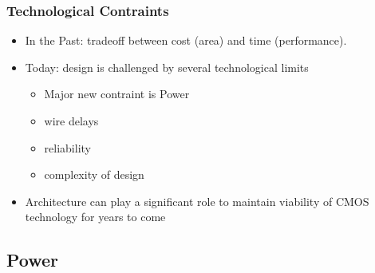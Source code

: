 \documentclass{beamer}
\begin{document}
\begin{frame}[fragile,t]
\frametitle{Technological Contraints}

\begin{itemize}
    \item In the Past: tradeoff between cost (area) and time (performance).\bigskip

    \item Today: design is challenged by several technological limits\smallskip
        \begin{itemize} 
            \item \alert{Major new contraint is Power}\smallskip
            \item wire delays\smallskip
            \item reliability\smallskip
            \item complexity of design
        \end  {itemize}\bigskip

    \item Architecture can play a significant role to maintain viability
            of CMOS technology for years to come
\end{itemize}
\end{frame}

\subsection{Power}
\end{document}
